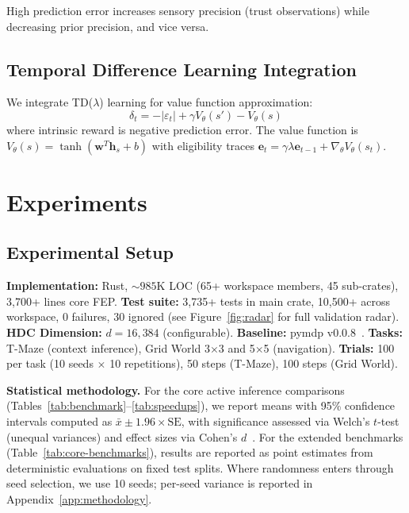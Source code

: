\documentclass[10pt,letterpaper]{article}
\newcommand{\hvec}[1]{\mathbf{h}_{#1}}
\begin{document}
High prediction error increases sensory precision (trust observations) while decreasing prior precision, and vice versa.

\subsection{Temporal Difference Learning Integration}

We integrate TD($\lambda$) learning for value function approximation:
\begin{equation}
\delta_t = -|\varepsilon_t| + \gamma V_\theta(s') - V_\theta(s)
\end{equation}
where intrinsic reward is negative prediction error. The value function is $V_\theta(s) = \tanh(\mathbf{w}^T \hvec{s} + b)$ with eligibility traces $\mathbf{e}_t = \gamma\lambda\mathbf{e}_{t-1} + \nabla_\theta V_\theta(s_t)$.

\section{Experiments}

\subsection{Experimental Setup}

\textbf{Implementation:} Rust, ${\sim}985$K LOC (65+ workspace members, 45 sub-crates), 3,700+ lines core FEP.
\textbf{Test suite:} 3,735+ tests in main crate, 10,500+ across workspace, 0 failures, 30 ignored (see Figure~\ref{fig:radar} for full validation radar).
\textbf{HDC Dimension:} $d = 16{,}384$ (configurable).
\textbf{Baseline:} pymdp v0.0.8~\cite{heins2022pymdp}.
\textbf{Tasks:} T-Maze (context inference), Grid World 3$\times$3 and 5$\times$5 (navigation).
\textbf{Trials:} 100 per task (10 seeds $\times$ 10 repetitions), 50 steps (T-Maze), 100 steps (Grid World).

\textbf{Statistical methodology.}
For the core active inference comparisons (Tables~\ref{tab:benchmark}--\ref{tab:speedups}), we report means with 95\% confidence intervals computed as $\bar{x} \pm 1.96 \times \mathrm{SE}$, with significance assessed via Welch's $t$-test (unequal variances) and effect sizes via Cohen's $d$~\cite{cohen1988statistical}.
For the extended benchmarks (Table~\ref{tab:core-benchmarks}), results are reported as point estimates from deterministic evaluations on fixed test splits.
Where randomness enters through seed selection, we use 10 seeds; per-seed variance is reported in Appendix~\ref{app:methodology}.
\end{document}
